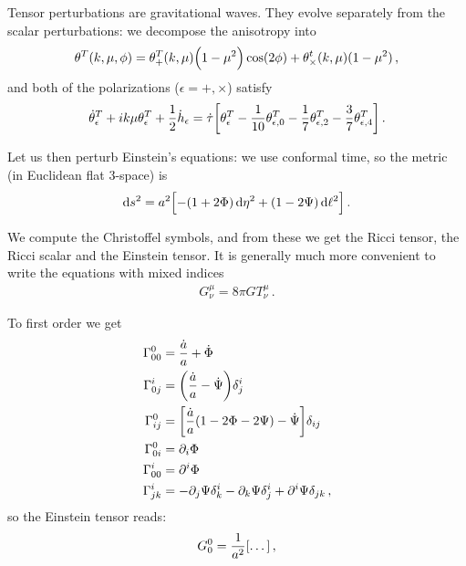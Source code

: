 \documentclass[main.tex]{subfiles}
\begin{document}
Tensor perturbations are gravitational waves. 
They evolve separately from the scalar perturbations: we decompose the anisotropy into 
%
\begin{align}
\theta^{T} (k, \mu, \phi ) = \theta^{T}_{+} (k, \mu ) \qty(1 - \mu^2) \cos( 2 \phi ) + \theta^{t}_{ \times } (k, \mu ) (1-\mu^2)
\,,
\end{align}
%
and both of the polarizations (\(\epsilon = +, \times \)) satisfy 
%
\begin{align}
\dot{\theta}^{T}_{\epsilon } + ik \mu \theta^{T}_{\epsilon } + \frac{1}{2} \dot{h}_{\epsilon } = \dot{\tau} \qty[
\theta^{T}_{\epsilon } - \frac{1}{10} \theta^{T}_{\epsilon, 0} - \frac{1}{7} \theta^{T}_{ \epsilon , 2} - \frac{3}{7} \theta^{T}_{\epsilon , 4}]
\,.
\end{align}

Let us then perturb Einstein's equations: we use conformal time, so the metric (in Euclidean flat 3-space) is 
%
\begin{align}
\dd{s^2} = a^2 \qty[- (1 + 2 \Phi ) \dd{\eta^2} + (1- 2 \Psi ) \dd{\ell^2}]
\,.
\end{align}

We compute the Christoffel symbols, and from these we get the Ricci tensor, the Ricci scalar and the Einstein tensor. 
It is generally much more convenient to write the equations with mixed indices 
%
\begin{align}
G^{\mu }_{\nu } = 8 \pi G T^{\mu }_{\nu }
\,.
\end{align}

To first order we get 
%
\begin{subequations}
\begin{align}
\Gamma^{0}_{00} &= \frac{ \dot{a} }{a } + \dot{\Phi}  \\
\Gamma^{i}_{0j }&= \qty(\frac{\dot{a}}{a} - \dot{\Psi}) \delta^{i}_{j}  \\
\Gamma^{0}_{ij} &= \qty[\frac{\dot{a}}{a } \qty(1 - 2 \Phi - 2 \Psi ) - \dot{\Psi}] \delta_{ij}  \\
\Gamma^{0}_{0i} &= \partial_{i} \Phi   \\
\Gamma^{i}_{00} &= \partial^{i} \Phi   \\
\Gamma^{i}_{jk} &= - \partial_{j} \Psi \delta^{i}_{k} - \partial_{k} \Psi \delta^{i}_{j} + \partial^{i} \Psi 
\delta_{jk}
\,,
\end{align}
\end{subequations}
%
so the Einstein tensor reads: 
%
\begin{align}
G^{0}_{0} = \frac{1}{a^2} \qty[\dots]
\,,
\end{align}
%
\end{document}
